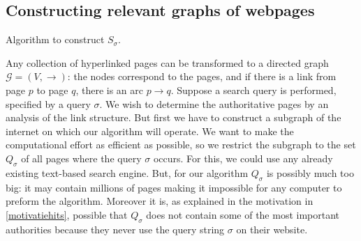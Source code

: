 \documentclass[a4paper,11pt]{report}
\newcommand{\graf}{\mathscr{G}}
\begin{document}
\subsection{Constructing relevant graphs of webpages}
\begin{algorithm}[t!]

\SetAlgoLined
 \blankline
{}
 
 \caption{Algorithm to construct $S_\sigma$.}\label{algoritmegraf}
\end{algorithm}
Any collection of hyperlinked pages can be transformed to a directed graph $\graf = (V, 
\to)$: the nodes correspond to the pages, and if there is a link from page $p$ 
to page $q$, there is an arc $p \to q$. Suppose a search query is performed, 
specified by a query $\sigma$. We wish to determine the authoritative 
pages by an analysis of the link structure. But first we have to construct a 
subgraph of the internet on which our algorithm will operate. We want to make the 
computational effort as efficient as possible, so we restrict the subgraph to 
the set $Q_\sigma$ of all pages where the query $\sigma$ occurs. For this, we could use
any already existing text-based search engine.  But, for our algorithm $Q_\sigma$ 
is possibly much too big: it may contain millions of pages making it impossible 
for any computer to preform the algorithm. Moreover it is, as explained in the motivation in \ref{motivatiehits}, possible that $Q_\sigma$ 
does not contain some of the most important authorities because they never use 
the query string $\sigma$ on their website.
\end{document}
